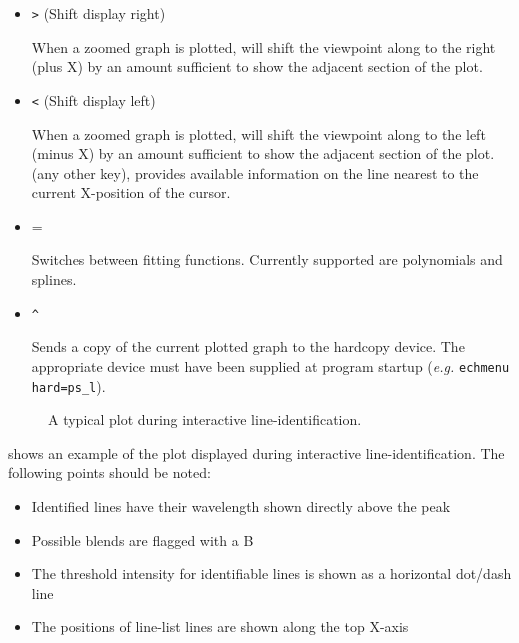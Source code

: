 \begin{itemize}
\begin{itemize}
      \item {\sunspec{\Large}{\bf} \verb+>+} (Shift display right)

            When a zoomed graph is
            plotted, will shift the viewpoint along to the right (plus X)
            by an amount sufficient to show the adjacent section of the
            plot.

      \item {\sunspec{\Large}{\bf} \verb+<+} (Shift display left)

            When a zoomed graph is plotted,
            will shift the viewpoint along to the left (minus X) by an
            amount sufficient to show the adjacent section of the plot.
            (any other key), provides available information on the line
            nearest to the current X-position of the cursor.

      \item {\sunspec{\Large\tt}{\bf} =}

            Switches between fitting functions.
            Currently supported are polynomials and splines.

      \item {\sunspec{\Large\tt}{\bf} \verb+^+}

            Sends a copy of the current plotted graph to the hardcopy device.
            The appropriate device must have been supplied at program startup
            ({\it{e.g.}} \verb+echmenu hard=ps_l+).

      \end{itemize}

\end{itemize}

\begin{figure}
\begin{center}
{\leavevmode\epsfysize=136mm}

\parbox{140mm}{
\caption{A typical plot during interactive line-identification.}
\label{fi_idline}
}
\end{center}
\end{figure}

shows an example of the plot displayed during interactive line-identification.
The following points should be noted:

\begin{itemize}
\item Identified lines have their wavelength shown directly above the peak
\item Possible blends are flagged with a B
\item The threshold intensity for identifiable lines is shown as a horizontal
dot/dash line
\item The positions of line-list lines are shown along the top X-axis
\end{itemize}

